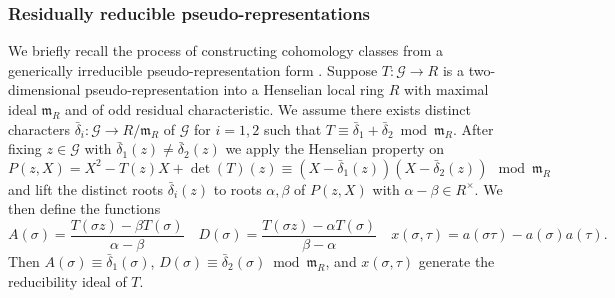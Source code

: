 \documentclass[leqno]{amsart}
\theoremstyle{definition}
\theoremstyle{remark}
\newcommand{\fm}{\mathfrak{m}}
\begin{document}
\subsubsection{Residually reducible pseudo-representations}

We briefly recall the process of constructing
cohomology classes from a generically irreducible
pseudo-representation form \cite[\S 2.1]{urban}.
Suppose $T\colon \mathcal{G}\to R$
is a two-dimensional pseudo-representation
into a Henselian local ring $R$
with maximal ideal $\fm_R$
and of odd residual characteristic.
We assume there exists distinct characters
$\bar{\delta}_i\colon \mathcal{G}\to R/\fm_R$ of $\mathcal{G}$
for $i=1,2$ such that  
$T\equiv \bar{\delta}_1+\bar{\delta}_2\bmod \fm_R$.
After fixing $z\in \mathcal{G}$
with $\bar{\delta}_1(z)\neq \bar{\delta}_2(z)$
we apply the Henselian property on
\begin{equation*}
    P(z,X)=
    X^2-T(z)X+\det(T)(z) \equiv 
    (X-\bar{\delta}_1(z))(X-\bar{\delta}_2(z))
    \mod \fm_R
\end{equation*}
and lift the distinct roots $\bar{\delta}_i(z)$
to roots $\alpha,\beta$ of $P(z,X)$
with $\alpha-\beta\in R^\times$.
We then define the functions
\begin{equation}\label{eq:presentation}
   A(\sigma)=
   \frac{T(\sigma z)-\beta T(\sigma)}{\alpha-\beta}\quad
   D(\sigma)=
   \frac{T(\sigma z)-\alpha T(\sigma)}{\beta-\alpha}\quad
   x(\sigma,\tau)=a(\sigma\tau)-a(\sigma)a(\tau).
\end{equation}
Then 
$A(\sigma)\equiv \bar{\delta}_1(\sigma)$,
$D(\sigma)\equiv \bar{\delta}_2(\sigma)\bmod\fm_R$,
and $x(\sigma,\tau)$
generate the reducibility ideal of $T$.
\end{document}
